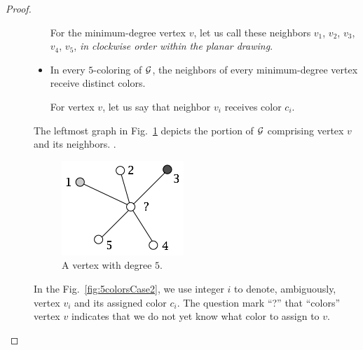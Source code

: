 \begin{proof}
\begin{description}
\begin{itemize}
\smallskip

For the minimum-degree vertex $v$, let us call these neighbors $v_1$, $v_2$, $v_3$, $v_4$, $v_5$, {\em in clockwise order within the planar drawing}.
\medskip\item
In every $5$-coloring of $\mbox{$\cal G$}$, the neighbors of every minimum-degree vertex receive distinct colors.

\smallskip

For vertex $v$, let us say that neighbor $v_i$ receives color $c_i$.
\end{itemize}
The leftmost graph in Fig.~\ref{fig:5colorsInit} depicts the portion of $\mbox{$\cal G$}$ comprising vertex $v$ and its neighbors.  .
\begin{figure}[hbt]
\begin{center}
   \includegraphics[scale=0.45]{FiguresGraph/5colorsInit}
\caption{A vertex with degree $5$.}
  \label{fig:5colorsInit}
\end{center}
\end{figure}
In the Fig.~\ref{fig:5colorsCase2}, we use integer $i$ to denote, ambiguously, vertex $v_i$ and its assigned color $c_i$.  
The question mark ``?'' that ``colors'' vertex $v$ indicates that we do not yet know what color to assign to $v$.  


\end{description}
\end{proof}
